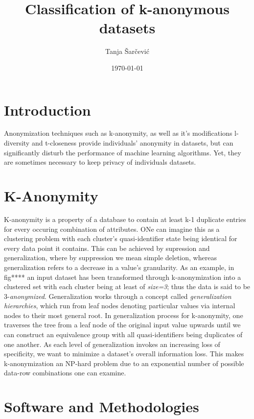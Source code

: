 \documentclass{article}
\begin{document}
\author{Tanja Šarčević}
\title{Classification of k-anonymous datasets}
\date{\today{}}
\maketitle{} %
\tableofcontents{} %
\newpage

\section{Introduction}
Anonymization techniques such as k-anonymity, as well as it's modifications l-diversity and t-closeness provide individuals' anonymity in datasets, but can significantly disturb the performance of machine learning algorithms. Yet, they are sometimes necessary to keep privacy of individuals datasets.
\newpage

\section{K-Anonymity}
 K-anonymity is a property of a database to contain at least k-1 duplicate entries for every occuring combination of attributes. ONe can imagine this as a clustering problem with each cluster's quasi-identifier state being identical for every data point it contains. This can be achieved by supression and generalization, where by suppression we mean simple deletion, whereas generalization refers to a decrease in a value's granularity. As an example, in fig**** an input dataset has been transformed through k-anonymization into a clustered set with each cluster being at least of \textit{size=3}; thus the data is said to be 3-\textit{anonymized}.
Generalization works through a concept called \textit{generalization hierarchies}, which run from leaf nodes denoting particular values via internal nodes to their most general root. In generalization process for k-anonymity, one traverses the tree from a leaf node of the original input value upwards until we can construct an equivalence group with all quasi-identifiers being duplicates of one another. 
As each level of generalization invokes an increasing loss of specificity, we want to minimize a dataset's overall information loss. This makes k-anonymization an NP-hard problem due to an exponential number of possible data-row combinations one can examine.
\newpage

\section{Software and Methodologies}
\end{document}
